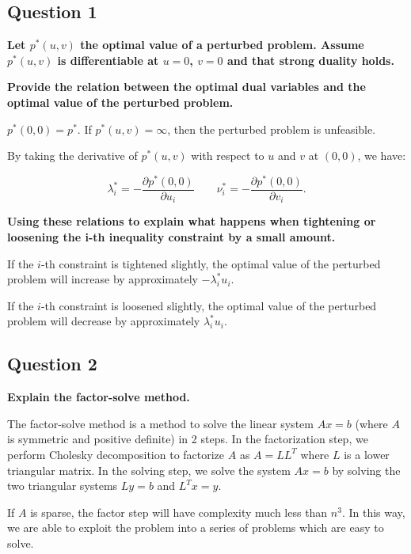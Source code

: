 
\subsection*{Question 1}
\textbf{Let $p^*(u, v)$ the optimal value of a perturbed problem. Assume $p^*(u, v)$ is diﬀerentiable at $u = 0$, $v = 0$ and that strong duality holds.}

\noindent \textbf{Provide the relation between the optimal dual variables and the optimal value of the perturbed problem.} 

$p^*(0, 0) = p^*$. If $p^*(u,v)=\infty$, then the perturbed problem is unfeasible. 

By taking the derivative of $p^*(u, v)$ with respect to $u$ and $v$ at $(0, 0)$, we have:

$$
\lambda_i^* = -\frac{\partial p^*(0,0)}{\partial u_i} \qquad \nu_i^* = -\frac{\partial p^*(0,0)}{\partial v_i}.
$$

\noindent \textbf{Using these relations to explain what happens when tightening or loosening the i-th inequality constraint by a small amount.}

If the $i$-th constraint is tightened slightly, the optimal value of the perturbed problem will increase by approximately $-\lambda^*_i u_i$. 

If the $i$-th constraint is loosened slightly, the optimal value of the perturbed problem will decrease by approximately $\lambda^*_i u_i$. 

\subsection*{Question 2}
\textbf{Explain the factor-solve method.}

The factor-solve method is a method to solve the linear system $Ax = b$ (where $A$ is symmetric and positive definite) in 2 steps. In the factorization step, we perform Cholesky decomposition to factorize $A$ as $A = LL^T$ where $L$ is a lower triangular matrix. In the solving step, we solve the system $Ax = b$ by solving the two triangular systems $Ly = b$ and $L^Tx = y$. 

If $A$ is sparse, the factor step will have complexity much less than $n^3$. In this way, we are able to exploit the problem into a series of problems which are easy to solve. 

